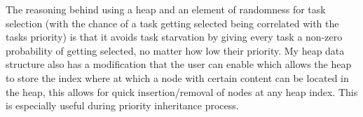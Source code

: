 \documentclass[12pt,a4paper]{article}
\begin{document}
The reasoning behind using a heap and an element of randomness for task selection (with the chance of a task getting selected being correlated with the tasks priority) is that it avoids task starvation by giving every task a non-zero probability of getting selected, no matter how low their priority. My heap data structure also has a modification that the user can enable which allows the heap to store the index where at which a node with certain content can be located in the heap, this allows for quick insertion/removal of nodes at any heap index. This is especially useful during priority inheritance process. 





\end{document}
